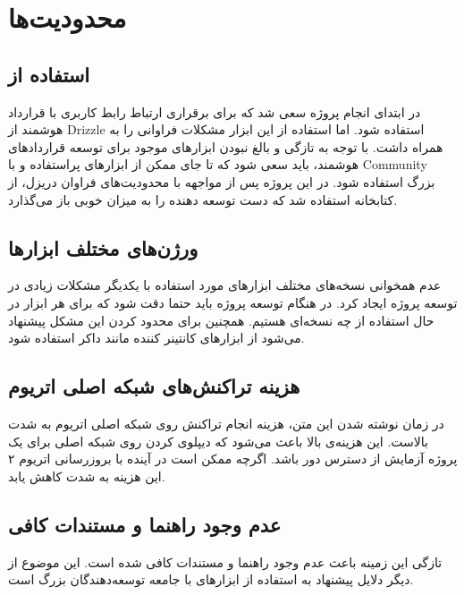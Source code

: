\section{محدودیت‌ها}

\subsection{استفاده از }
در ابتدای انجام پروژه سعی شد که برای برقراری ارتباط رابط کاربری با قرارداد هوشمند از
\gls{Drizzle}
استفاده شود.
اما استفاده از این ابزار مشکلات فراوانی را به همراه داشت.
با توجه به تازگی و بالغ نبودن ابزارهای موجود برای توسعه قراردادهای هوشمند،
باید سعی شود که تا جای ممکن از ابزارهای پراستفاده و با
\gls{Community}
بزرگ استفاده شود. در این پروژه پس از مواجهه با محدودیت‌های فراوان دریزل،
از کتابخانه‌  استفاده شد که دست توسعه دهنده را به میزان خوبی باز می‌گذارد.

\subsection{ورژن‌های مختلف ابزارها}
عدم همخوانی نسخه‌های مختلف ابزارهای مورد استفاده با یکدیگر مشکلات زیادی در توسعه پروژه ایجاد کرد.
در هنگام توسعه پروژه باید حتما دقت شود که برای هر ابزار در حال استفاده از چه نسخه‌ای هستیم.
همچنین برای محدود کردن این مشکل پیشنهاد می‌شود از ابزارهای کانتینر کننده مانند داکر استفاده شود.

\subsection{هزینه تراکنش‌های شبکه اصلی اتریوم}
در زمان نوشته شدن این متن، هزینه انجام تراکنش روی شبکه اصلی اتریوم به شدت بالاست.
این هزینه‌ی بالا باعث می‌شود که دیپلوی کردن روی شبکه اصلی برای یک پروژه آزمایش از دسترس دور باشد.
اگرچه ممکن است در آینده با بروزرسانی اتریوم ۲ این هزینه به شدت کاهش یابد.

\subsection{عدم وجود راهنما و مستندات کافی}
تازگی این زمینه باعث عدم وجود راهنما و مستندات کافی شده است.
این موضوع از دیگر دلایل پیشنهاد به استفاده از ابزارهای با جامعه توسعه‌دهندگان بزرگ است.
